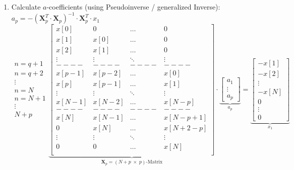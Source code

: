 		\begin{enumerate}
			\item Calculate $a$-coefficients (using Pseudoinverse / generalized Inverse): $a_p = -\left(\bm X_p^T \cdot \bm  X_p\right)^{-1} \cdot \bm X_p^T \cdot x_1$
				\small
				$$
				\begin{matrix} n=q+1\\ n=q+2\\ \vdots \\ n=N\\ n=N+1\\ \vdots \\ N+p
				\end{matrix}
				\underbrace{\begin{bmatrix}
					x[0] & 0 & \hdots & 0 \\
					x[1] & x[0] & \hdots & 0 \\
					x[2] & x[1] & \hdots & 0 \\
					\vdots & \vdots & \ddots & \vdots \\
					----&----&----&----\\
					x[p-1] & x[p-2] & \hdots & x[0] \\
					x[p] & x[p-1] & \hdots & x[1] \\
					\vdots & \vdots & \ddots & \vdots \\
					x[N-1] & x[N-2] & \hdots & x[N-p] \\
					----&----&----&----\\
					x[N] & x[N-1] & \hdots & x[N-p+1] \\
					0 & x[N] & \hdots & x[N+2-p] \\
					\vdots & \vdots & \ddots & \vdots \\
					0 & 0 & \hdots & x[N] \\
				\end{bmatrix}  }_{\bm X_p=(N+p \; \times \; p)\text{-Matrix}} \cdot \underbrace{\begin{bmatrix}
					a_1 \\
					\vdots \\
					a_p
				\end{bmatrix}  }_{a_p}= \underbrace{\begin{bmatrix}
					 -x [1]\\
					 -x [2]\\
					\vdots \\
					 -x [N]\\
					0 \\
					\vdots \\
					0
				\end{bmatrix}}_{x_1}
				 $$ \normalsize
			\end{enumerate}

